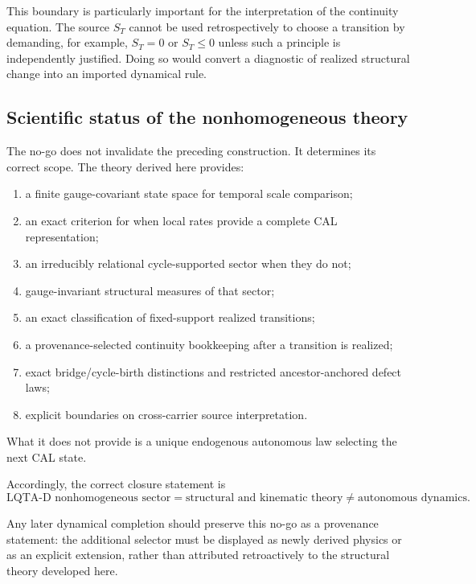 This boundary is particularly important for the interpretation of the continuity equation. The source $S_T$ cannot be used retrospectively to choose a transition by demanding, for example, $S_T=0$ or $S_T\le0$ unless such a principle is independently justified. Doing so would convert a diagnostic of realized structural change into an imported dynamical rule.

\subsection{Scientific status of the nonhomogeneous theory}

The no-go does not invalidate the preceding construction. It determines its correct scope. The theory derived here provides:
\begin{enumerate}
\item a finite gauge-covariant state space for temporal scale comparison;
\item an exact criterion for when local rates provide a complete CAL representation;
\item an irreducibly relational cycle-supported sector when they do not;
\item gauge-invariant structural measures of that sector;
\item an exact classification of fixed-support realized transitions;
\item a provenance-selected continuity bookkeeping after a transition is realized;
\item exact bridge/cycle-birth distinctions and restricted ancestor-anchored defect laws;
\item explicit boundaries on cross-carrier source interpretation.
\end{enumerate}
What it does not provide is a unique endogenous autonomous law selecting the next CAL state.

Accordingly, the correct closure statement is
\begin{equation}
\boxed{
\text{LQTA-D nonhomogeneous sector}
=
\text{structural and kinematic theory}
\neq
\text{autonomous dynamics}.
}
\label{eq:structural-closure}
\end{equation}

Any later dynamical completion should preserve this no-go as a provenance statement: the additional selector must be displayed as newly derived physics or as an explicit extension, rather than attributed retroactively to the structural theory developed here.